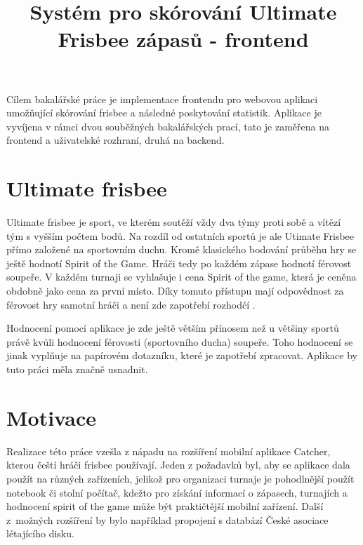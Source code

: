 \documentclass[thesis=B,czech]{FITthesis}[2012/06/26]
\title{Systém pro skórování Ultimate Frisbee zápasů - frontend}
\begin{document}

\begin{introduction}

	Cílem bakalářské práce je implementace frontendu pro webovou aplikaci umožňující skórování frisbee a následné poskytování statistik. Aplikace je vyvíjena v rámci dvou souběžných bakalářských prací, tato je zaměřena na frontend a uživatelské rozhraní, druhá na backend.

	\section{Ultimate frisbee}

		Ultimate frisbee je sport, ve kterém soutěží vždy dva týmy proti sobě a vítězí tým s vyšším počtem bodů. Na rozdíl od ostatních sportů je ale Utimate Frisbee přímo založené na sportovním duchu. Kromě klasického bodování průběhu hry se ještě hodnotí Spirit of the Game. Hráči tedy po každém zápase hodnotí férovost soupeře. V každém turnaji se vyhlašuje i cena Spirit of the game, která je ceněna obdobně jako cena za první místo. Díky tomuto přístupu mají odpovědnost za férovost hry samotní hráči a není zde zapotřebí rozhodčí \cite{frisbee}.

		Hodnocení pomocí aplikace je zde ještě větším přínosem než u většiny sportů právě kvůli hodnocení férovosti (sportovního ducha) soupeře. Toho hodnocení se jinak vyplňuje na papírovém dotazníku, které je zapotřebí zpracovat. Aplikace by tuto práci měla značně usnadnit.

	\section{Motivace}

		Realizace této práce vzešla z nápadu na rozšíření mobilní aplikace Catcher, kterou čeští hráči frisbee používají. 
		Jeden z požadavků byl, aby se aplikace dala použít na různých zařízeních, jelikož pro organizaci turnaje je pohodlnější použít notebook či stolní počítač, kdežto pro získání informací o zápasech, turnajích a hodnocení spirit of the game může být praktičtější mobilní zařízení. Další z~možných rozšíření by bylo například propojení s databází České asociace létajícího disku.

\end{introduction}
\end{document}
